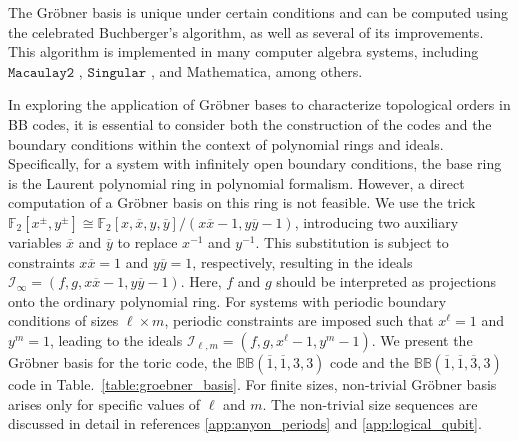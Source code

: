 \documentclass[aps,prl,english,superscriptaddress,twocolumn,tightenlines,showpacs,longbibliography,floatfix,amsfonts]{revtex4-2}
\begin{document}
The Gr\"obner basis is unique under certain conditions and can be computed using the celebrated Buchberger's algorithm, as well as several of its improvements. This algorithm is implemented in many computer algebra systems, including $\texttt{Macaulay2}$ \cite{M2}, $\texttt{Singular}$ \cite{DGPS}, and Mathematica, among others.

In exploring the application of Gr\"obner bases to characterize topological orders in BB codes, it is essential to consider both the construction of the codes and the boundary conditions within the context of polynomial rings and ideals. Specifically, for a system with infinitely open boundary conditions, the base ring is the Laurent polynomial ring in polynomial formalism. However, a direct computation of a Gr\"obner basis on this ring is not feasible. We use the trick $\mathbb{F}_2[x^\pm, y^\pm] \cong \mathbb{F}_2[x,\overline{x}, y, \overline{y}] / (x\overline{x}-1, y\overline{y}-1)$,  introducing two auxiliary variables $\overline{x}$ and $\overline{y}$ to replace $x^{-1}$ and $y^{-1}$. This substitution is subject to constraints $x\overline{x}=1$ and $y\overline{y}=1$, respectively, resulting in the ideals $\mathcal{I}_\infty = (f,g,x\overline{x}-1, y\overline{y}-1)$. Here, $f$ and $g$ should be interpreted as projections onto the ordinary polynomial ring.  For systems with periodic boundary conditions of sizes $\ell\times m$, periodic constraints are imposed such that $x^\ell = 1$ and $y^m=1$, leading to the ideals $\mathcal{I}_{\ell,m} = (f,g,x^\ell-1, y^m-1)$. We present the Gr\"obner basis for the toric code, the $\mathbb{BB}(\overline{1},\overline{1},3,3)$ code and the $\mathbb{BB}(\overline{1},\overline{1},\overline{3},3)$ code in Table.~\ref{table:groebner_basis}. For finite sizes,  non-trivial Gr\"obner basis arises only for specific values of $\ell$ and $m$. The non-trivial size sequences are discussed in detail in references \ref{app:anyon_periods} and \ref{app:logical_qubit}.
\end{document}
